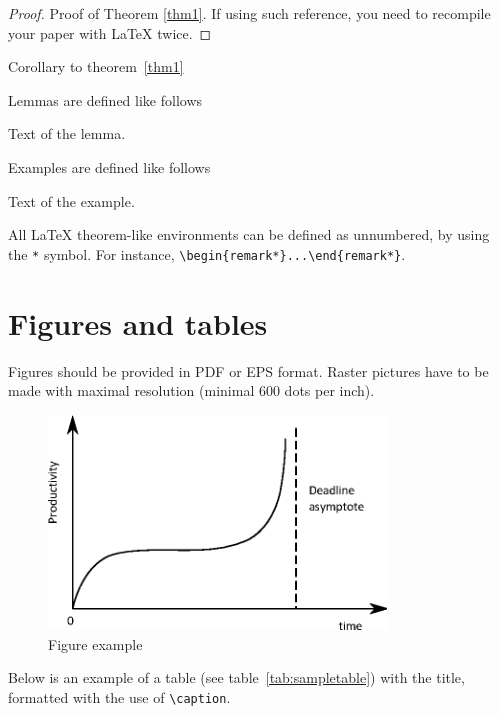 \documentclass[11pt]{article}
\begin{document}
\begin{proof}
Proof of Theorem \ref{thm1}. If using such reference, you need
to recompile your paper with \LaTeX{} twice.
\end{proof}

\begin{coroll}
Corollary to theorem~\ref{thm1}
\end{coroll}

Lemmas are defined like follows
\begin{lem}\label{lem1}
Text of the lemma.
\end{lem}

Examples are defined like follows
\begin{example}
Text of the example.
\end{example}

\begin{remark*}
All \LaTeX{} theorem-like environments can be defined as unnumbered, by using the \verb"*"  symbol. For instance, \verb"\begin{remark*}...\end{remark*}".
\end{remark*}

\section{Figures and tables}

Figures should be provided in PDF or EPS format. Raster pictures have
to be made with maximal resolution (minimal 600 dots per inch).

\begin{figure}[ht!]
   \centering
     \includegraphics[width=0.8\textwidth]{funny_graph_en}
    \caption {Figure example}
\label{fig:example_graph}
\end{figure}

Below is an example of a table (see table~\ref{tab:sampletable}) with the title, formatted with the use of \verb"\caption".
\end{document}
